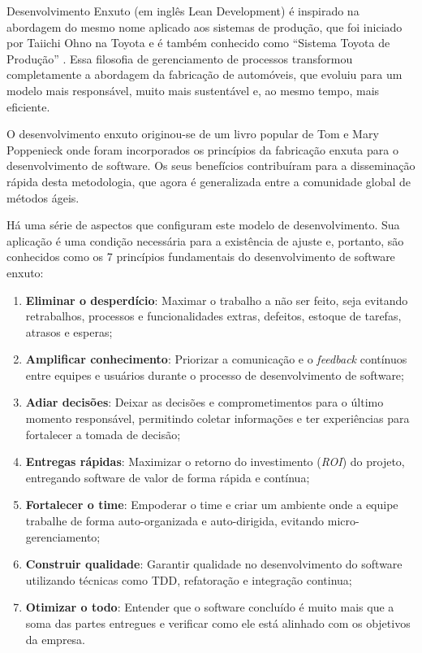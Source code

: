 \documentclass[10pt]{article}
\begin{document}
        Desenvolvimento Enxuto (em inglês Lean Development) é inspirado na abordagem do mesmo nome aplicado aos sistemas de produção, que foi iniciado por Taiichi Ohno na Toyota e é também conhecido como “Sistema Toyota de Produção” \cite{Lean:Toyota} . Essa filosofia de gerenciamento de processos transformou completamente a abordagem da fabricação de automóveis, que evoluiu para um modelo mais responsável, muito mais sustentável e, ao mesmo tempo, mais eficiente.
        
        O desenvolvimento enxuto originou-se de um livro  popular de Tom e Mary Poppenieck onde foram incorporados os princípios da fabricação enxuta para o desenvolvimento de software. \cite{Lean:Poppendieck} Os seus benefícios contribuíram para a disseminação rápida desta metodologia, que agora é generalizada entre a comunidade global de métodos ágeis.
        
        Há uma série de aspectos que configuram este modelo de desenvolvimento. Sua aplicação é uma condição necessária para a existência de ajuste e, portanto, são conhecidos como os 7 princípios fundamentais do desenvolvimento de software enxuto:
        
        \begin{enumerate}
            \item \textbf{Eliminar o desperdício}: 
            Maximar o trabalho a não ser feito, seja evitando retrabalhos, processos e funcionalidades extras, defeitos, estoque de tarefas, atrasos e esperas;
            
            \item \textbf{Amplificar conhecimento}: 
                Priorizar a comunicação e o \textit{feedback} contínuos entre equipes e usuários durante o processo de desenvolvimento de software;
            \item \textbf{Adiar decisões}:
                Deixar as decisões e comprometimentos para o último momento responsável, permitindo coletar informações e ter experiências para fortalecer a tomada de decisão;
            \item \textbf{Entregas rápidas}: 
                Maximizar o retorno do investimento (\textit{ROI}) do projeto, entregando software de valor de forma rápida e contínua;
            \item \textbf{Fortalecer o time}: 
                Empoderar o time e criar um ambiente onde a equipe trabalhe de forma auto-organizada e auto-dirigida, evitando micro-gerenciamento;
            \item \textbf{Construir qualidade}: 
                Garantir qualidade no desenvolvimento do software utilizando técnicas como TDD, refatoração e integração continua;
            \item \textbf{Otimizar o todo}: 
                Entender que o software concluído é muito mais que a soma das partes entregues e verificar como ele está alinhado com os objetivos da empresa.
        \end{enumerate}
        
\end{document}
